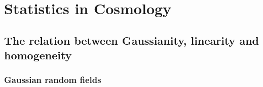 \chapter{Statistics in Cosmology \label{chap:Statistics}} %



\section{The relation between Gaussianity, linearity and homogeneity}

\subsection{Gaussian random fields}

